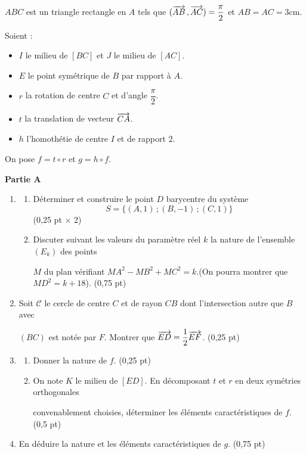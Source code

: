 
$ABC$ est un triangle rectangle en $A$ tels que $(\overrightarrow{AB}\,,\overrightarrow{AC}) = \dfrac{\pi}{2}$ et $AB = AC = 3\text{cm}$.

Soient :
\begin{itemize}[label=\textbullet]
	\item $I$ le milieu de $[BC]$ et $J$ le milieu de $[AC]$.
	\item $E$ le point symétrique de $B$ par rapport à $A$.
	\item $r$ la rotation de centre $C$ et d'angle $\dfrac{\pi}{2}$.
	\item $t$ la translation de vecteur $\overrightarrow{CA}$.
	\item $h$ l'homothétie de centre $I$ et de rapport $2$.
\end{itemize}

On pose $f = t \circ r$ et $g = h \circ f$.

\medskip
\noindent\textbf{Partie A}

\begin{enumerate}
	\item
	\begin{enumerate}
		\item Déterminer et construire le point $D$ barycentre du système
		$$
		S = \{(A,1)\,;(B,-1)\,;(C,1)\}
		$$
		\hfill (0,25 pt $\times$ 2)
		\item Discuter suivant les valeurs du paramètre réel $k$ la nature de l'ensemble $(E_k)$ des points

		$M$ du plan vérifiant $MA^2 - MB^2 + MC^2 = k$.(On pourra montrer que $MD^2 = k+18$). \hfill (0,75 pt)
	\end{enumerate}
	\item Soit $\mathscr{C}$ le cercle de centre $C$ et de rayon $CB$ dont l'intersection autre que $B$ avec

	$(BC)$ est notée par $F$. Montrer que $\overrightarrow{ED} = \dfrac{1}{2}\overrightarrow{EF}$. \hfill (0,25 pt)
	\item
	\begin{enumerate}
		\item Donner la nature de $f$. \hfill (0,25 pt)
		\item On note $K$ le milieu de $[ED]$. En décomposant $t$ et $r$ en deux symétries orthogonales

		convenablement choisies, déterminer les éléments caractéristiques de $f$. \hfill (0,5 pt)
	\end{enumerate}
	\item En déduire la nature et les éléments caractéristiques de $g$. \hfill (0,75 pt)
\end{enumerate}

